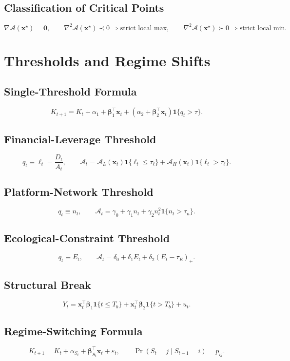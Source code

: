 \documentclass[11pt]{article}
\begin{document}
\subsection{Classification of Critical Points}
\[
\nabla\mathcal{A}(\bm{x}^{\star})=\bm{0},
\qquad \nabla^2\mathcal{A}(\bm{x}^{\star})\prec 0\Rightarrow \text{strict local max},
\qquad \nabla^2\mathcal{A}(\bm{x}^{\star})\succ 0\Rightarrow \text{strict local min}.
\]

\section{Thresholds and Regime Shifts}

\subsection{Single-Threshold Formula}
\[
K_{t+1}=K_t+\alpha_1+\bm{\beta}_1^\top\bm{x}_t+\left(\alpha_2+\bm{\beta}_2^\top\bm{x}_t\right)\mathbf{1}\{q_t>\tau\}.
\]

\subsection{Financial-Leverage Threshold}
\[
q_t\equiv \ell_t=\frac{D_t}{A_t},
\qquad \mathcal{A}_t=\mathcal{A}_L(\bm{x}_t)\mathbf{1}\{\ell_t\le\tau_\ell\}+\mathcal{A}_H(\bm{x}_t)\mathbf{1}\{\ell_t>\tau_\ell\}.
\]

\subsection{Platform-Network Threshold}
\[
q_t\equiv n_t,
\qquad \mathcal{A}_t=\gamma_0+\gamma_1 n_t+\gamma_2 n_t^2\mathbf{1}\{n_t>\tau_n\}.
\]

\subsection{Ecological-Constraint Threshold}
\[
q_t\equiv E_t,
\qquad \mathcal{A}_t=\delta_0+\delta_1 E_t+\delta_2(E_t-\tau_E)_+.
\]

\subsection{Structural Break}
\[
Y_t=\bm{x}_t^\top\bm{\beta}_1\mathbf{1}\{t\le T_b\}+\bm{x}_t^\top\bm{\beta}_2\mathbf{1}\{t>T_b\}+u_t.
\]

\subsection{Regime-Switching Formula}
\[
K_{t+1}=K_t+\alpha_{S_t}+\bm{\beta}_{S_t}^\top\bm{x}_t+\varepsilon_t,
\qquad \Pr(S_t=j\mid S_{t-1}=i)=p_{ij}.
\]
\end{document}
